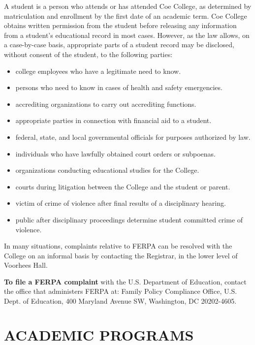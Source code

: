\documentclass[
  letterpaper,
]{scrbook}
\providecommand{\tightlist}{%
  \setlength{\itemsep}{0pt}\setlength{\parskip}{0pt}}
\renewcommand{\part}[1]{\addcontentsline{toc}{part}{#1}}
\begin{document}
A student is a person who attends or has attended Coe College, as
determined by matriculation and enrollment by the first date of an
academic term. Coe College obtains written permission from the student
before releasing any information from a student's educational record in
most cases. However, as the law allows, on a case-by-case basis,
appropriate parts of a student record may be disclosed, without consent
of the student, to the following parties:

\begin{itemize}
\tightlist
\item
  college employees who have a legitimate need to know.
\item
  persons who need to know in cases of health and safety emergencies.
\item
  accrediting organizations to carry out accrediting functions.
\item
  appropriate parties in connection with financial aid to a student.
\item
  federal, state, and local governmental officials for purposes
  authorized by law.
\item
  individuals who have lawfully obtained court orders or subpoenas.
\item
  organizations conducting educational studies for the College.
\item
  courts during litigation between the College and the student or
  parent.
\item
  victim of crime of violence after final results of a disciplinary
  hearing.
\item
  public after disciplinary proceedings determine student committed
  crime of violence.
\end{itemize}

In many situations, complaints relative to FERPA can be resolved with
the College on an informal basis by contacting the Registrar, in the
lower level of Voorhees Hall.

\textbf{To file a FERPA complaint} with the U.S. Department of
Education, contact the office that administers FERPA at: Family Policy
Compliance Office, U.S. Dept. of Education, 400 Maryland Avenue SW,
Washington, DC 20202-4605.

\part{COURSES OF INSTRUCTION}

\chapter{ACADEMIC PROGRAMS}\label{sec-academic-programs}
\end{document}
